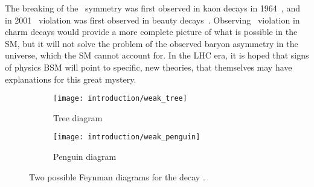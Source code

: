 The breaking of the \CP\ symmetry was first observed in kaon decays in 
1964~\cite{Christenson:1964fg}, and in 2001 \CP\ violation was first observed 
in beauty decays~\cite{Aubert:2001nu,Abe:2001xe}.
Observing \CP\ violation in charm decays would provide a more complete picture 
of what is possible in the \ac{SM}, but it will not solve the problem of the 
observed baryon asymmetry in the universe, which the \ac{SM} cannot account 
for.
In the \ac{LHC} era, it is hoped that signs of physics \acl{BSM} will point to 
specific, new theories, that themselves may have explanations for this great 
mystery.

\begin{figure}
  \begin{subfigure}{0.40\textwidth}
    \centering
    \texttt{[image: introduction/weak\_tree]}
    \caption{Tree diagram}
    \label{fig:intro:sm:weak_feynman:tree}
  \end{subfigure}
  \begin{subfigure}{0.55\textwidth}
    \centering
    \texttt{[image: introduction/weak\_penguin]}
    \caption{Penguin diagram}
    \label{fig:intro:sm:weak_feynman:penguin}
  \end{subfigure}
  \caption{%
    Two possible Feynman diagrams for the decay \decay{\PBzero}{\PKplus\Ppiminus}.
  }
  \label{fig:intro:sm:weak_feynman}
\end{figure}
